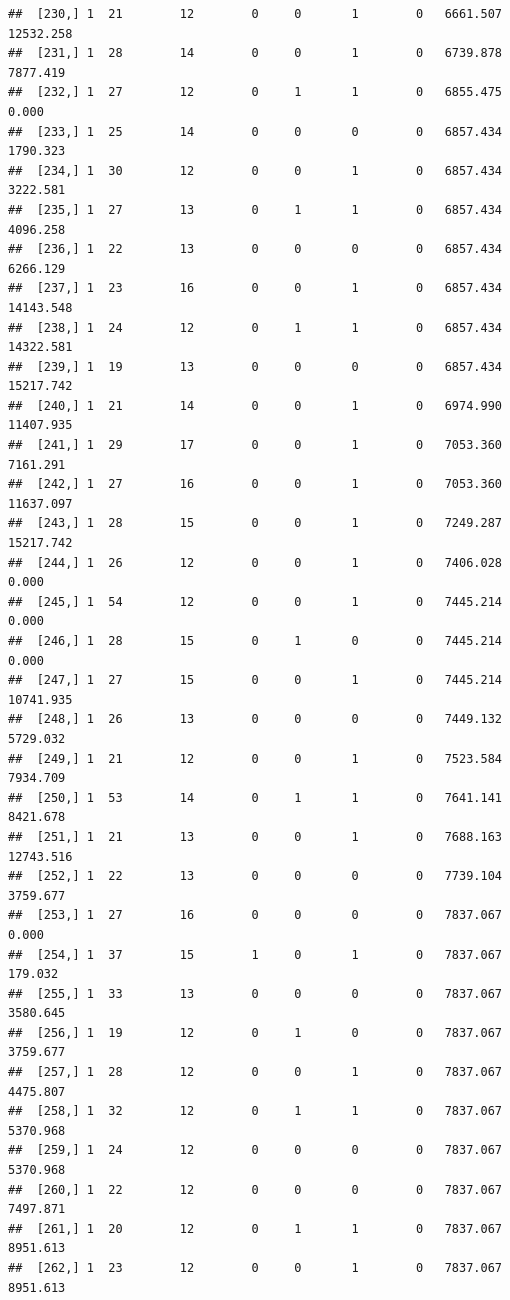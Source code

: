 \documentclass[
]{article}
\begin{document}
\begin{verbatim}
##  [230,] 1  21        12        0     0       1        0   6661.507  12532.258
##  [231,] 1  28        14        0     0       1        0   6739.878   7877.419
##  [232,] 1  27        12        0     1       1        0   6855.475      0.000
##  [233,] 1  25        14        0     0       0        0   6857.434   1790.323
##  [234,] 1  30        12        0     0       1        0   6857.434   3222.581
##  [235,] 1  27        13        0     1       1        0   6857.434   4096.258
##  [236,] 1  22        13        0     0       0        0   6857.434   6266.129
##  [237,] 1  23        16        0     0       1        0   6857.434  14143.548
##  [238,] 1  24        12        0     1       1        0   6857.434  14322.581
##  [239,] 1  19        13        0     0       0        0   6857.434  15217.742
##  [240,] 1  21        14        0     0       1        0   6974.990  11407.935
##  [241,] 1  29        17        0     0       1        0   7053.360   7161.291
##  [242,] 1  27        16        0     0       1        0   7053.360  11637.097
##  [243,] 1  28        15        0     0       1        0   7249.287  15217.742
##  [244,] 1  26        12        0     0       1        0   7406.028      0.000
##  [245,] 1  54        12        0     0       1        0   7445.214      0.000
##  [246,] 1  28        15        0     1       0        0   7445.214      0.000
##  [247,] 1  27        15        0     0       1        0   7445.214  10741.935
##  [248,] 1  26        13        0     0       0        0   7449.132   5729.032
##  [249,] 1  21        12        0     0       1        0   7523.584   7934.709
##  [250,] 1  53        14        0     1       1        0   7641.141   8421.678
##  [251,] 1  21        13        0     0       1        0   7688.163  12743.516
##  [252,] 1  22        13        0     0       0        0   7739.104   3759.677
##  [253,] 1  27        16        0     0       0        0   7837.067      0.000
##  [254,] 1  37        15        1     0       1        0   7837.067    179.032
##  [255,] 1  33        13        0     0       0        0   7837.067   3580.645
##  [256,] 1  19        12        0     1       0        0   7837.067   3759.677
##  [257,] 1  28        12        0     0       1        0   7837.067   4475.807
##  [258,] 1  32        12        0     1       1        0   7837.067   5370.968
##  [259,] 1  24        12        0     0       0        0   7837.067   5370.968
##  [260,] 1  22        12        0     0       0        0   7837.067   7497.871
##  [261,] 1  20        12        0     1       1        0   7837.067   8951.613
##  [262,] 1  23        12        0     0       1        0   7837.067   8951.613

\end{verbatim}
\end{document}
